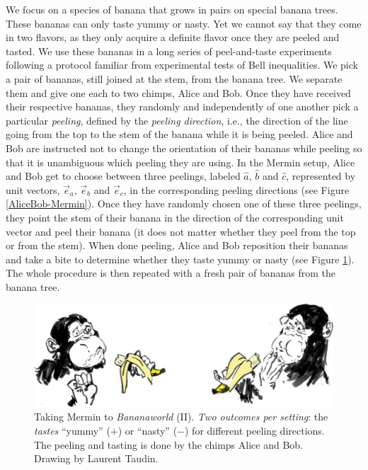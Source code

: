 We focus on a species of banana that grows in pairs on special banana trees. These bananas can only taste yummy or nasty. Yet we cannot say that they come in two flavors, as they only acquire a definite flavor once they are peeled and tasted. We use these bananas in a long series of peel-and-taste experiments following a protocol familiar from experimental tests of Bell inequalities. We pick a pair of bananas, still joined at the stem, from the banana tree. We separate them and give one each to two chimps, Alice and Bob. Once they have received their respective bananas, they randomly and independently of one another pick a particular \emph{peeling}, defined by the \emph{peeling direction}, i.e., the direction of the line going from the top to the stem of the banana while it is being peeled. Alice and Bob are instructed not to change the orientation of their bananas while peeling so that it is unambiguous which peeling they are using. In the Mermin setup, Alice and Bob get to choose between three peelings, labeled $\hat{a}$, $\hat{b}$ and $\hat{c}$, represented by unit vectors, $\vec{e}_a$, $\vec{e}_b$ and $\vec{e}_c$, in the corresponding peeling directions (see Figure \ref{AliceBob-Mermin}). Once they have randomly chosen one of these three peelings, they point the stem of their banana in the direction of the corresponding unit vector and peel their banana (it does not matter whether they peel from the top or from the stem). When done peeling, Alice and Bob reposition their bananas and take a bite to determine whether they taste yummy or nasty (see Figure \ref{AliceBob-tasting}). The whole procedure is then repeated with a fresh pair of bananas from the banana tree. 

\begin{figure}[ht]
\centering
    \includegraphics[width=4.5in]{AliceBob-tasting.jpg}
 \caption{Taking Mermin to \emph{Bananaworld} (II). \emph{Two outcomes per setting}: the \emph{tastes} ``yummy'' ($+$) or ``nasty'' ($-$) for different peeling directions. The peeling and tasting is done by the chimps Alice and Bob. Drawing by Laurent Taudin.}
   \label{AliceBob-tasting}
\end{figure}

